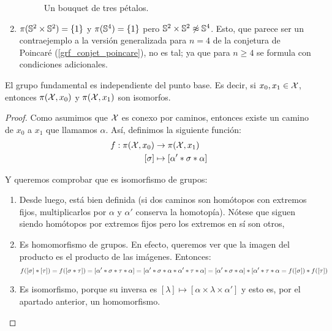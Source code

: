 \begin{exa}
\begin{enumerate}
\begin{figure}[h!]
			\caption{Un bouquet de tres pétalos.}
		\end{figure}
	
		\item $\pi(\mathbb{S}^2\times\mathbb{S}^2)=\{1\}$ y $\pi(\mathbb{S}^4)=\{1\}$ pero $\Sfe^2\times\Sfe^2\centernot\homeo\Sfe^4$. Esto, que parece ser un contraejemplo a la versión generalizada para $n=4$ de la conjetura de Poincaré (\ref{grf_conjet_poincare}), no es tal; ya que para $n\geq 4$ se formula con condiciones adicionales. \qedhere
	\end{enumerate}
\end{exa}

\begin{prop}
	El grupo fundamental es independiente del punto base. Es decir, si $x_0,x_1\in\mathcal{X}$, entonces $\pi(\mathcal{X},x_0)$ y $\pi(\mathcal{X},x_1)$ son isomorfos.
	
	\begin{proof}
		Como asumimos que $\mathcal{X}$ es conexo por caminos, entonces existe un camino de $x_0$ a $x_1$ que llamamos $\alpha$. Así, definimos la siguiente función:
		\[\begin{split}
		f:\pi(\mathcal{X},x_0) &\to \pi(\mathcal{X},x_1) \\
		[\sigma]&\mapsto [\alpha'\mathbin{*}\sigma\mathbin{*}\alpha]
		\end{split}\]
		
		Y queremos comprobar que es isomorfismo de grupos:
		\begin{enumerate}
			\item Desde luego, está bien definida (si dos caminos son homótopos con extremos fijos, multiplicarlos por $\alpha$ y $\alpha'$ conserva la homotopía). Nótese que siguen siendo homótopos por extremos fijos pero los extremos en sí son otros,
			
			\item Es homomorfismo de grupos. En efecto, queremos ver que la imagen del producto es el producto de las imágenes. Entonces:
			\[f([\sigma]\mathbin{*}[\tau]) = f([\sigma\mathbin{*}\tau])=[\alpha'\mathbin{*}\sigma\mathbin{*}\tau\mathbin{*}\alpha]=[\alpha'\mathbin{*}\sigma\mathbin{*}\alpha\mathbin{*}\alpha'\mathbin{*}\tau\mathbin{*}\alpha] = [\alpha'\mathbin{*}\sigma\mathbin{*}\alpha]\mathbin{*}[\alpha'\mathbin{*}\tau\mathbin{*}\alpha=f([\sigma])\mathbin{*} f([\tau])\]
			
			\item Es isomorfismo, porque su inversa es $[\lambda]\mapsto[\alpha\times\lambda\times\alpha']$ y esto es, por el apartado anterior, un homomorfismo. \qedhere
		\end{enumerate}
	\end{proof}
\end{prop}

